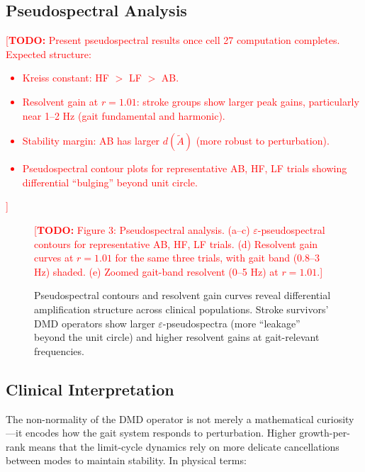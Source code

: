 \documentclass[12pt]{article}
\newcommand{\Atilde}{\tilde{A}}
\newcommand{\todo}[1]{\textcolor{red}{[\textbf{TODO:} #1]}}
\begin{document}
\subsection{Pseudospectral Analysis}
\label{sec:results_pseudo}

\todo{Present pseudospectral results once cell 27 computation completes.
Expected structure:
\begin{itemize}
  \item Kreiss constant: HF $>$ LF $>$ AB.
  \item Resolvent gain at $r=1.01$: stroke groups show larger peak gains,
  particularly near 1--2 Hz (gait fundamental and harmonic).
  \item Stability margin: AB has larger $d(\Atilde)$ (more robust to
  perturbation).
  \item Pseudospectral contour plots for representative AB, HF, LF trials
  showing differential ``bulging'' beyond unit circle.
\end{itemize}}

\begin{figure}[t]
  \centering
  \todo{Figure 3: Pseudospectral analysis.
  (a--c) $\varepsilon$-pseudospectral contours for representative AB, HF, LF trials.
  (d) Resolvent gain curves at $r = 1.01$ for the same three trials,
      with gait band (0.8--3 Hz) shaded.
  (e) Zoomed gait-band resolvent (0--5 Hz) at $r=1.01$.}
  \caption{Pseudospectral contours and resolvent gain curves reveal
  differential amplification structure across clinical populations.
  Stroke survivors' DMD operators show larger $\varepsilon$-pseudospectra
  (more ``leakage'' beyond the unit circle) and higher resolvent gains
  at gait-relevant frequencies.}
  \label{fig:pseudospectra}
\end{figure}

\subsection{Clinical Interpretation}
\label{sec:clinical}

The non-normality of the DMD operator is not merely a mathematical curiosity
---it encodes how the gait system responds to perturbation. Higher
growth-per-rank means that the limit-cycle dynamics rely on more delicate
cancellations between modes to maintain stability. In physical terms:
\end{document}
